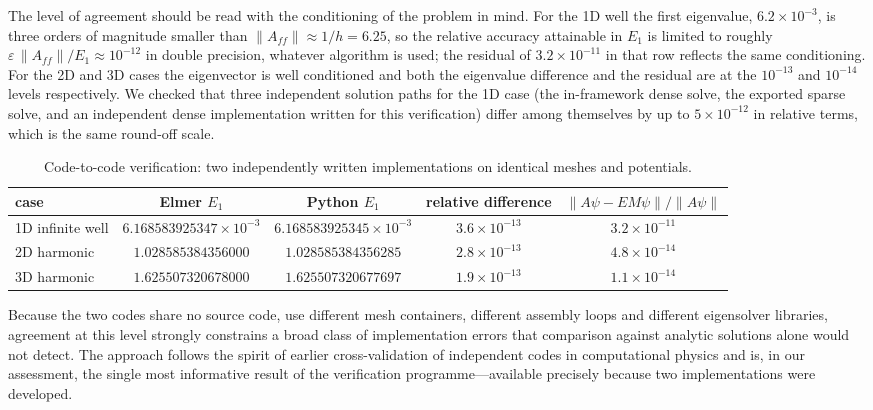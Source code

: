\documentclass[pdflatex,sn-mathphys-num]{sn-jnl}
\theoremstyle{thmstyleone}%
\theoremstyle{thmstyletwo}%
\theoremstyle{thmstylethree}%
\begin{document}
The level of agreement should be read with the conditioning of the problem in
mind. For the 1D well the first eigenvalue, $6.2\times10^{-3}$, is three orders
of magnitude smaller than $\|A_{ff}\| \approx 1/h = 6.25$, so the relative
accuracy attainable in $E_1$ is limited to roughly
$\varepsilon\,\|A_{ff}\|/E_1 \approx 10^{-12}$ in double precision, whatever
algorithm is used; the residual of $3.2\times10^{-11}$ in that row reflects the
same conditioning. For the 2D and 3D cases the eigenvector is well conditioned
and both the eigenvalue difference and the residual are at the $10^{-13}$ and
$10^{-14}$ levels respectively. We checked that three independent solution paths
for the 1D case (the in-framework dense solve, the exported sparse solve, and an
independent dense implementation written for this verification) differ among
themselves by up to $5\times10^{-12}$ in relative terms, which is the same
round-off scale.

\begin{table}[t]
\caption{Code-to-code verification: two independently written implementations on
identical meshes and potentials.}\label{tab:codetocode}
\begin{tabular}{@{}lccc c@{}}
\toprule
case & \textsf{Elmer} $E_1$ & Python $E_1$ & relative difference
& $\|A\psi - E M\psi\|/\|A\psi\|$ \\
\midrule
1D infinite well & $6.168583925347\times10^{-3}$ & $6.168583925345\times10^{-3}$ & $3.6\times10^{-13}$ & $3.2\times10^{-11}$ \\
2D harmonic & $1.028585384356000$ & $1.028585384356285$ & $2.8\times10^{-13}$ & $4.8\times10^{-14}$ \\
3D harmonic & $1.625507320678000$ & $1.625507320677697$ & $1.9\times10^{-13}$ & $1.1\times10^{-14}$ \\
\bottomrule
\end{tabular}
\end{table}

Because the two codes share no source code, use different mesh containers,
different assembly loops and different eigensolver libraries, agreement at this
level strongly constrains a broad class of implementation errors that comparison against
analytic solutions alone would not detect. The approach follows the spirit of
earlier cross-validation of independent codes in computational
physics \cite{paes2003} and is, in our assessment, the single most informative
result of the verification programme---available precisely because two
implementations were developed.
\end{document}
